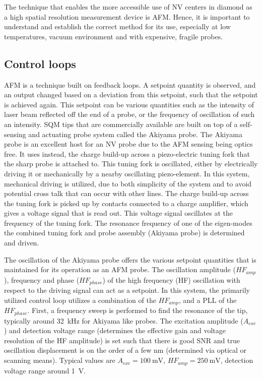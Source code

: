 The technique that enables the more accessible use of \gls{NV} centers in diamond as a high spatial resolution measurement device is \gls{AFM}. Hence, it is important to understand and establish the correct method for its use, especially at low temperatures, vacuum environment and with expensive, fragile probes. 

\subsection*{Control loops}
\label{sub:control_loops}

\gls{AFM} is a technique built on feedback loops. A setpoint quantity is observed, and an output changed based on a deviation from this setpoint, such that the setpoint is achieved again. This setpoint can be various quantities such as the intensity of laser beam reflected off the end of a probe, or the frequency of oscillation of such an intensity. \gls{SQM} tips that are commercially available are built on top of a self-sensing and actuating probe system called the Akiyama probe\cite{akiyamaImplementationCharacterizationQuartz2010}. The Akiyama probe is an excellent host for an \gls{NV} probe due to the \gls{AFM} sensing being optics free. It uses instead, the charge build-up across a piezo-electric tuning fork that the sharp probe is attached to. This tuning fork is oscillated, either by electrically driving it or mechanically by a nearby oscillating piezo-element. In this system, mechanical driving is utilized, due to both simplicity of the system and to avoid potential cross talk that can occur with other lines. The charge build-up across the tuning fork is picked up by contacts connected to a charge amplifier, which gives a voltage signal that is read out. This voltage signal oscillates at the frequency of the tuning fork. The resonance frequency of one of the eigen-modes the combined tuning fork and probe assembly (Akiyama probe) is determined and driven.

The oscillation of the Akiyama probe offers the various setpoint quantities that is maintained for its operation as an \gls{AFM} probe. The oscillation amplitude ($HF_{amp}$), frequency and phase ($HF_{phase}$) of the high frequency (\gls{HF}) oscillation with respect to the driving signal can act as a setpoint. In this system, the primarily utilized control loop utilizes a combination of the $HF_{amp}$, and a \gls{PLL} of the $HF_{phase}$. First, a frequency sweep is performed to find the resonance of the tip, typically around \qty{32}{\kilo\hertz} for Akiyama like probes. The excitation amplitude ($A_{exc}$) and detection voltage range (determines the effective gain and voltage resolution of the \gls{HF} amplitude) is set such that there is good \gls{SNR} and true oscillation displacement is on the order of a few $\unit{\nano\meter}$ (determined via optical or scanning means). Typical values are $A_{exc}=\qty{100}{\milli\volt}$, $HF_{amp}=\qty{250}{\milli\volt}$, detection voltage range around \qty{1}{\volt}.

